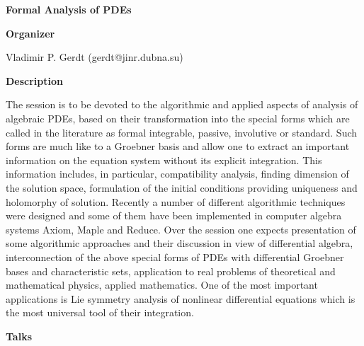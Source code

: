 \begin{center}
{\LARGE \bf Formal Analysis of PDEs
}
\end{center}
\bigskip

\noindent
{\bf Organizer}

\medskip

Vladimir P. Gerdt (gerdt@jinr.dubna.su)

\bigskip

\noindent
{\bf Description}
\medskip

The session is to be devoted to the algorithmic and applied aspects of analysis of algebraic PDEs,
based on their transformation into the special forms which are called in the literature as formal
integrable, passive, involutive or standard. Such forms are much like to a Groebner basis and allow
one to extract an important information on the equation system without its explicit integration.
This information includes, in particular, compatibility analysis, finding dimension of the solution
space, formulation of the initial conditions providing uniqueness and holomorphy of solution.
Recently a number of different algorithmic techniques were designed and some of them have been
implemented in computer algebra systems Axiom, Maple and Reduce. Over the session one
expects presentation of some algorithmic approaches and their discussion in view of differential
algebra, interconnection of the above special forms of PDEs with differential Groebner bases and
characteristic sets, application to real problems of theoretical and mathematical physics, applied
mathematics. One of the most important applications is Lie symmetry analysis of nonlinear
differential equations which is the most universal tool of their integration. 

\bigskip
\noindent
{\bf Talks}
\medskip

